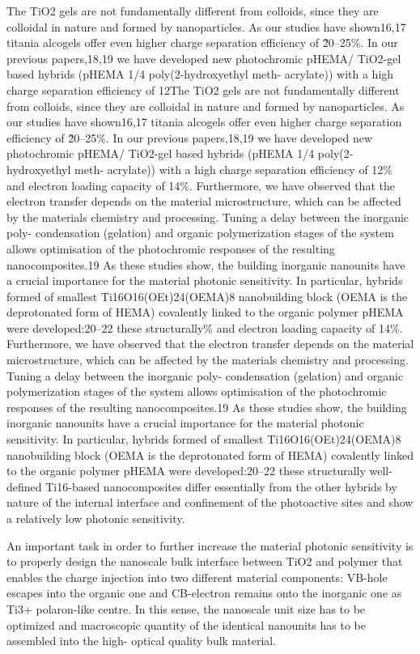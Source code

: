 The TiO2 gels are not fundamentally different from colloids,
since they are colloidal in nature and formed by nanoparticles.
As our studies have shown16,17 titania alcogels offer even higher
charge separation efficiency of \~20–25\%. In our previous
papers,18,19 we have developed new photochromic pHEMA/
TiO2-gel based hybrids (pHEMA 1/4 poly(2-hydroxyethyl meth-
acrylate)) with a high charge separation efficiency of 12The TiO2 gels are not fundamentally different from colloids,
since they are colloidal in nature and formed by nanoparticles.
As our studies have shown16,17 titania alcogels offer even higher
charge separation efficiency of \~20–25\%. In our previous
papers,18,19 we have developed new photochromic pHEMA/
TiO2-gel based hybrids (pHEMA 1/4 poly(2-hydroxyethyl meth-
acrylate)) with a high charge separation efficiency of 12\% and
electron loading capacity of 14\%. Furthermore, we have
observed that the electron transfer depends on the material
microstructure, which can be affected by the materials chemistry
and processing. Tuning a delay between the inorganic poly-
condensation (gelation) and organic polymerization stages of the
system allows optimisation of the photochromic responses of the
resulting nanocomposites.19 As these studies show, the building
inorganic nanounits have a crucial importance for the material
photonic sensitivity. In particular, hybrids formed of smallest
Ti16O16(OEt)24(OEMA)8 nanobuilding block (OEMA is the
deprotonated form of HEMA) covalently linked to the organic
polymer pHEMA were developed:20–22 these structurally\% and
electron loading capacity of 14\%. Furthermore, we have
observed that the electron transfer depends on the material
microstructure, which can be affected by the materials chemistry
and processing. Tuning a delay between the inorganic poly-
condensation (gelation) and organic polymerization stages of the
system allows optimisation of the photochromic responses of the
resulting nanocomposites.19 As these studies show, the building
inorganic nanounits have a crucial importance for the material
photonic sensitivity. In particular, hybrids formed of smallest
Ti16O16(OEt)24(OEMA)8 nanobuilding block (OEMA is the
deprotonated form of HEMA) covalently linked to the organic
polymer pHEMA were developed:20–22 these structurally
well-defined Ti16-based nanocomposites differ essentially from
the other hybrids by nature of the internal interface and
confinement of the photoactive sites and show a relatively low
photonic sensitivity.

An important task in order to further increase the material
photonic sensitivity is to properly design the nanoscale bulk
interface between TiO2 and polymer that enables the charge
injection into two different material components: VB-hole
escapes into the organic one and CB-electron remains onto the
inorganic one as Ti3+ polaron-like centre. In this sense, the
nanoscale unit size has to be optimized and macroscopic quantity
of the identical nanounits has to be assembled into the high-
optical quality bulk material.

